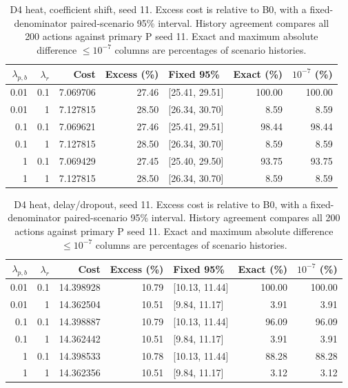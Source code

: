 \begin{table}[ht]
\centering\small
\caption{D4 heat, coefficient shift, seed 11. Excess cost is relative to B0, with a fixed-denominator paired-scenario 95\% interval. History agreement compares all 200 actions against primary P seed 11. Exact and maximum absolute difference $\leq10^{-7}$ columns are percentages of scenario histories.}\label{tab:weights_control_heat_locked_coefficient_ood}
\begin{tabular}{@{}rrrrlrr@{}}\toprule
$\lambda_{p,b}$ & $\lambda_r$ & Cost & Excess (\%) & Fixed 95\% & Exact (\%) & $10^{-7}$ (\%)\\\midrule
0.01 & 0.1 & 7.069706 & 27.46 & [25.41, 29.51] & 100.00 & 100.00\\
0.01 & 1 & 7.127815 & 28.50 & [26.34, 30.70] & 8.59 & 8.59\\
0.1 & 0.1 & 7.069621 & 27.46 & [25.41, 29.51] & 98.44 & 98.44\\
0.1 & 1 & 7.127815 & 28.50 & [26.34, 30.70] & 8.59 & 8.59\\
1 & 0.1 & 7.069429 & 27.45 & [25.40, 29.50] & 93.75 & 93.75\\
1 & 1 & 7.127815 & 28.50 & [26.34, 30.70] & 8.59 & 8.59\\
\bottomrule\end{tabular}
\end{table}

\begin{table}[ht]
\centering\small
\caption{D4 heat, delay/dropout, seed 11. Excess cost is relative to B0, with a fixed-denominator paired-scenario 95\% interval. History agreement compares all 200 actions against primary P seed 11. Exact and maximum absolute difference $\leq10^{-7}$ columns are percentages of scenario histories.}\label{tab:weights_control_heat_locked_delay_dropout}
\begin{tabular}{@{}rrrrlrr@{}}\toprule
$\lambda_{p,b}$ & $\lambda_r$ & Cost & Excess (\%) & Fixed 95\% & Exact (\%) & $10^{-7}$ (\%)\\\midrule
0.01 & 0.1 & 14.398928 & 10.79 & [10.13, 11.44] & 100.00 & 100.00\\
0.01 & 1 & 14.362504 & 10.51 & [9.84, 11.17] & 3.91 & 3.91\\
0.1 & 0.1 & 14.398887 & 10.79 & [10.13, 11.44] & 96.09 & 96.09\\
0.1 & 1 & 14.362442 & 10.51 & [9.84, 11.17] & 3.91 & 3.91\\
1 & 0.1 & 14.398533 & 10.78 & [10.13, 11.44] & 88.28 & 88.28\\
1 & 1 & 14.362356 & 10.51 & [9.84, 11.17] & 3.12 & 3.12\\
\bottomrule\end{tabular}
\end{table}
